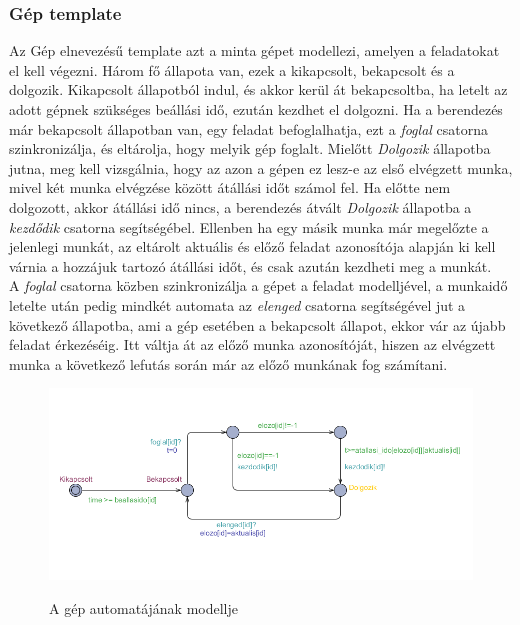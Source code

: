 \documentclass {report}
\begin{document}
    \subsubsection*{Gép template}
    Az Gép elnevezésű template azt a minta gépet modellezi, amelyen a feladatokat el kell végezni. Három fő állapota van, ezek a kikapcsolt, bekapcsolt és a dolgozik. Kikapcsolt állapotból indul, és akkor kerül át bekapcsoltba, ha letelt az adott gépnek szükséges beállási idő, ezután kezdhet el dolgozni.  Ha a berendezés már bekapcsolt állapotban van, egy feladat befoglalhatja, ezt a \emph{foglal} csatorna szinkronizálja, és eltárolja, hogy melyik gép foglalt. Mielőtt \emph{Dolgozik} állapotba jutna, meg kell vizsgálnia, hogy az azon a gépen ez lesz-e az első elvégzett munka, mivel két munka elvégzése között átállási időt számol fel. Ha előtte nem dolgozott, akkor átállási idő nincs, a berendezés átvált \emph{Dolgozik} állapotba a \emph{kezdődik} csatorna segítségébel. Ellenben ha egy másik munka már megelőzte a jelenlegi munkát, az eltárolt aktuális és előző feladat azonosítója alapján ki kell várnia a hozzájuk tartozó átállási időt, és csak azután kezdheti meg a munkát. \\
    A \emph{foglal} csatorna közben szinkronizálja a gépet a feladat modelljével, a munkaidő letelte után pedig mindkét automata az \emph{elenged} csatorna segítségével jut a következő állapotba, ami a gép esetében a bekapcsolt állapot, ekkor vár az újabb feladat érkezéséig. Itt váltja át az előző munka azonosítóját, hiszen az elvégzett munka a következő lefutás során már az előző munkának fog számítani. 
    \begin{figure}[htpb]
    \begin{center}
   \includegraphics[width=12cm]{gep}\\
    \caption{A gép automatájának modellje}
    \end{center}
    \end{figure}\\
\end{document}

